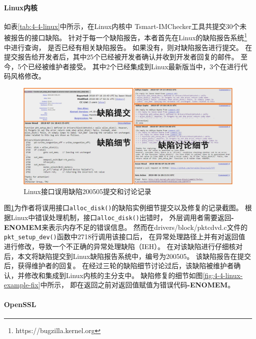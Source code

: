 

\paragraph{Linux内核}
如表\ref{tab:4-4-linux}中所示，在Linux内核中
Tsmart-IMChecker工具共提交30个未被报告的接口缺陷。
针对于每一个缺陷报告，本者首先在Linux的缺陷报告系统\footnote{https://bugzilla.kernel.org}中进行查询，
是否已经有相关缺陷报告。
如果没有，则对缺陷报告进行提交。
在提交报告给开发者后，其中25个已经被开发者确认并收到开发者回复的邮件。
至今，5个已经被维护者接受。
其中2个已经集成到Linux最新版当中，3个在进行代码风格修改。

\begin{figure}[b]
	\centering
	\includegraphics[width=\linewidth]{figures/cp4-linux-example.png}
	\caption{
		Linux接口误用缺陷200505提交和讨论记录
	}
	\label{fig:4-4-linux-example}
\end{figure}




图\ref{fig:4-4-linux-example}为作者将误用接口\texttt{alloc\_disk()}的缺陷实例细节提交以及修复的记录截图。
根据Linux中错误处理机制，接口\texttt{alloc\_disk()}出错时，
外层调用者需要返回\textbf{-ENOMEM}来表示内存不足的错误信息。
然而在drivers/block/pktcdvd.c文件的\texttt{pkt\_setup\_dev()}函数中2718行调用该接口后，
在异常处理路径上并有对返回值进行修改，导致一个不正确的异常处理缺陷（IEH）。
在对该缺陷进行仔细核对后，本文将缺陷提交到Linux缺陷报告系统中，编号为200505。
该缺陷报告在提交后，获得维护者的回复。
在经过三轮的缺陷细节讨论过后，该缺陷被维护者确认，并修改和集成到Linux内核的主分支中。
缺陷修复的细节如图\ref{fig:4-4-linux-example-fix}中所示，
即在返回之前对返回值赋值为错误代码\textbf{-ENOMEM}。


\paragraph{OpenSSL}


